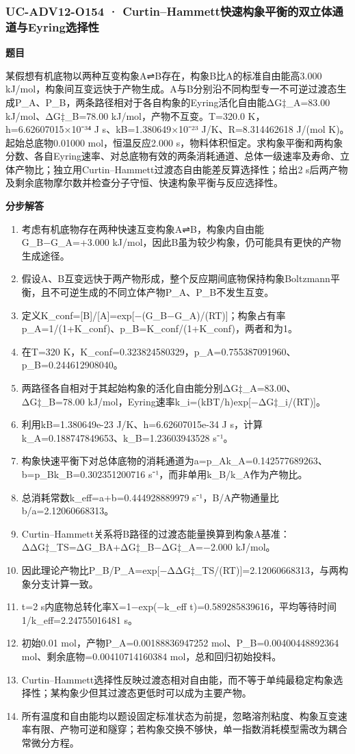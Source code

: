 \documentclass[UTF8,11pt,a4paper]{ctexart}
\begin{document}
\subsubsection*{UC-ADV12-O154 · Curtin–Hammett快速构象平衡的双立体通道与Eyring选择性}
\noindent\textbf{题目}\par
某假想有机底物以两种互变构象A⇌B存在，构象B比A的标准自由能高3.000 kJ/mol，构象间互变远快于产物生成。A与B分别沿不同构型专一不可逆过渡态生成P\_A、P\_B，两条路径相对于各自构象的Eyring活化自由能ΔG‡\_A=83.00 kJ/mol、ΔG‡\_B=78.00 kJ/mol，产物不互变。T=320.0 K，h=6.62607015×10⁻³⁴ J s、kB=1.380649×10⁻²³ J/K、R=8.314462618 J/(mol K)。起始总底物0.01000 mol，恒温反应2.000 s，物料体积恒定。求构象平衡和两构象分数、各自Eyring速率、对总底物有效的两条消耗通道、总体一级速率及寿命、立体产物比；独立用Curtin–Hammett过渡态自由能差反算选择性；给出2 s后两产物及剩余底物摩尔数并检查分子守恒、快速构象平衡与反应选择性。\par
\medskip\noindent\textbf{分步解答}
\begin{enumerate}
\item 考虑有机底物存在两种快速互变构象A⇌B，构象内自由能G\_B−G\_A=+3.000 kJ/mol，因此B虽为较少构象，仍可能具有更快的产物生成途径。
\item 假设A、B互变远快于两产物形成，整个反应期间底物保持构象Boltzmann平衡，且不可逆生成的不同立体产物P\_A、P\_B不发生互变。
\item 定义K\_conf=[B]/[A]=exp[−(G\_B−G\_A)/(RT)]；构象占有率p\_A=1/(1+K\_conf)、p\_B=K\_conf/(1+K\_conf)，两者和为1。
\item 在T=320 K，K\_conf=0.323824580329，p\_A=0.755387091960、p\_B=0.244612908040。
\item 两路径各自相对于其起始构象的活化自由能分别ΔG‡\_A=83.00、ΔG‡\_B=78.00 kJ/mol，Eyring速率k\_i=(kBT/h)exp[−ΔG‡\_i/(RT)]。
\item 利用kB=1.380649e-23 J/K、h=6.62607015e-34 J s，计算k\_A=0.188747849653、k\_B=1.23603943528 s⁻¹。
\item 构象快速平衡下对总体底物的消耗通道为a=p\_Ak\_A=0.142577689263、b=p\_Bk\_B=0.302351200716 s⁻¹，而非单用k\_B/k\_A作为产物比。
\item 总消耗常数k\_eff=a+b=0.444928889979 s⁻¹，B/A产物通量比b/a=2.12060668313。
\item Curtin–Hammett关系将B路径的过渡态能量换算到构象A基准：ΔΔG‡\_TS=ΔG\_BA+ΔG‡\_B−ΔG‡\_A=−2.000 kJ/mol。
\item 因此理论产物比P\_B/P\_A=exp[−ΔΔG‡\_TS/(RT)]=2.12060668313，与两构象分支计算一致。
\item t=2 s内底物总转化率X=1−exp(−k\_eff t)=0.589285839616，平均等待时间1/k\_eff=2.24755016481 s。
\item 初始0.01 mol，产物P\_A=0.00188836947252 mol、P\_B=0.00400448892364 mol、剩余底物=0.00410714160384 mol，总和回归初始投料。
\item Curtin–Hammett选择性反映过渡态相对自由能，而不等于单纯最稳定构象选择性；某构象少但其过渡态更低时可以成为主要产物。
\item 所有温度和自由能均以题设固定标准状态为前提，忽略溶剂粘度、构象互变速率有限、产物可逆和隧穿；若构象交换不够快，单一指数消耗模型需改为耦合常微分方程。
\end{enumerate}
\end{document}
